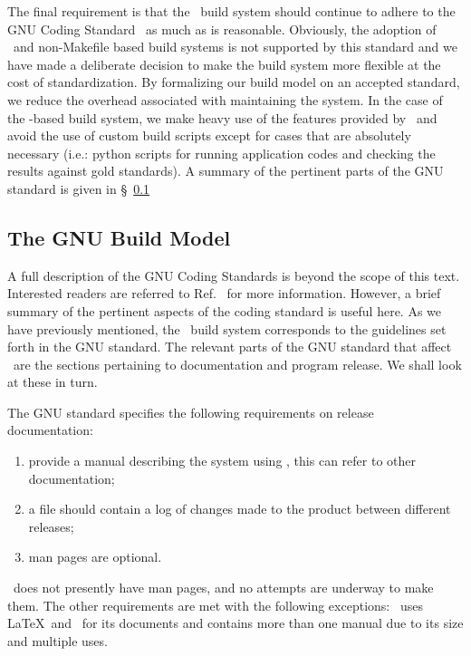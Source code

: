 
The final requirement is that the \draco\ build system should continue to adhere to the GNU Coding Standard~\cite{gnu} as much as is reasonable.  Obviously, the adoption of \cmake\ and non-Makefile based build systems is not supported by this standard and we have made a deliberate decision to make the build system more flexible at the cost of standardization.  By formalizing our build model on an accepted standard, we reduce the overhead associated with maintaining the system. In the case of the \cmake-based build system, we make heavy use of the features provided by \cmake\ and avoid the use of custom build scripts except for cases that are absolutely necessary (i.e.: python scripts for running application codes and checking the results against gold standards).  A summary of the pertinent parts of the GNU standard is given in \S~\ref{sec:gnu_build_model}

\subsection{The GNU Build Model}
\label{sec:gnu_build_model}

A full description of the GNU Coding Standards is beyond the scope of
this text.  Interested readers are referred to Ref.~\cite{gnu} for
more information.  However, a brief summary of the pertinent aspects
of the coding standard is useful here.  As we have previously
mentioned, the \draco\ build system corresponds to the guidelines set
forth in the GNU standard.  The relevant parts of the GNU standard
that affect \draco\ are the sections pertaining to documentation and
program release.  We shall look at these in turn.

The GNU standard specifies the following requirements on release
documentation:
\begin{enumerate}
\item provide a manual describing the system using , this can refer to other documentation;
\item a  file should contain a log of changes made to the product between different releases;
\item man pages are optional.
\end{enumerate}
\draco\ does not presently have man pages, and no attempts are
underway to make them.  The other requirements are met with the
following exceptions: \draco\ uses \LaTeX\ and \doxygen\ for its documents and
contains more than one manual due to its size and multiple uses.

